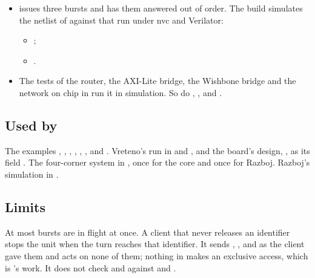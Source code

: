 \begin{itemize}
\begin{itemize}
\end{itemize}
All of these run in .
\item {} issues three bursts and has them answered out of
order. The build simulates the netlist of  against that run under nvc and Verilator:
\begin{itemize}
\item {};
\item {}.
\end{itemize}
\item The tests of the router, the AXI-Lite bridge, the Wishbone bridge
and the network on chip in  run it in simulation.
So do , ,
 and .
\end{itemize}

\subsection*{Used by}

The examples , , ,
, , ,
 and . Vreteno's run in
 and , and
the board's design, , as its field . The
four-corner system in , once for the core and
once for Razboj. Razboj's simulation in .

\subsection*{Limits}

At most  bursts are in flight at once. A client that never
releases an identifier stops the unit when the turn reaches that
identifier. It sends , ,  and
 as the client gave them and acts on none of them; nothing
in  makes an exclusive access, which is
's work. It does not check
 and  against  and .

